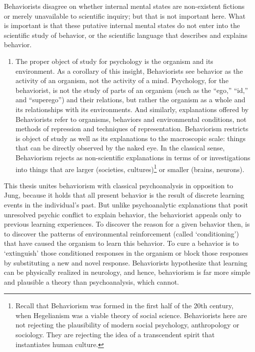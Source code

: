 Behaviorists disagree on whether internal mental states are non-existent fictions or merely unavailable to scientific inquiry; but that is not important here. What is important is that these putative internal mental states do not enter into the scientific study of behavior, or the scientific language that describes and explains behavior.

\begin{enumerate}
\item The proper object of study for psychology is the organism and its environment. As a corollary of this insight, Behaviorists see behavior as the activity of an organism, not the activity of a mind. Psychology, for the behaviorist, is not the study of parts of an organism (such as the “ego,” “id,” and “superego”) and their relations, but rather the organism as a whole and its relationships with its environments. And similarly, explanations offered by Behaviorists refer to organisms, behaviors and environmental conditions, not methods of repression and techniques of representation. Behaviorism restricts is object of study as well as its explanations to the macroscopic scale: things that can be directly observed by the naked eye. In the classical sense, Behaviorism rejects as non-scientific explanations in terms of or investigations into things that are larger (societies, cultures)\footnote{Recall that Behaviorism was formed in the first half of the 20th century, when Hegelianism was a viable theory of social science. Behaviorists here are not rejecting the plausibility of modern social psychology, anthropology or sociology. They are rejecting the idea of a transcendent spirit that instantiates human culture.} or smaller (brains, neurons).

\end{enumerate}

This thesis unites behaviorism with classical psychoanalysis in opposition to Jung, because it holds that all present behavior is the result of discrete learning events in the individual's past. But unlike psychoanalytic explanations that posit unresolved psychic conflict to explain behavior, the behaviorist appeals only to previous learning experiences. To discover the reason for a given behavior then, is to discover the patterns of environmental reinforcement (called `conditioning') that have caused the organism to learn this behavior. To cure a behavior is to `extinguish' those conditioned responses in the organism or block those responses by substituting a new and novel response. Behaviorists hypothesize that learning can be physically realized in neurology, and hence, behaviorism is far more simple and plausible a theory than psychoanalysis, which cannot.

